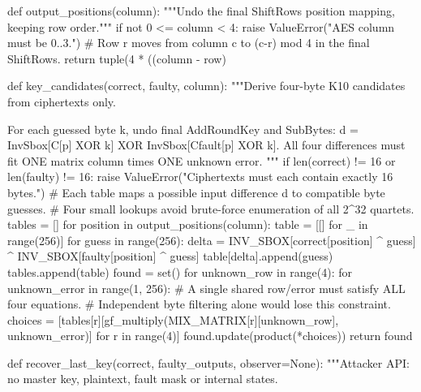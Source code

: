 \begin{lightcode}[numbers=left,firstnumber=1]
def output_positions(column):
    """Undo the final ShiftRows position mapping, keeping row order."""
    if not 0 <= column < 4:
        raise ValueError("AES column must be 0..3.")
    # Row r moves from column c to (c-r) mod 4 in the final ShiftRows.
    return tuple(4 * ((column - row) %


def key_candidates(correct, faulty, column):
    """Derive four-byte K10 candidates from ciphertexts only.

    For each guessed byte k, undo final AddRoundKey and SubBytes:
      d = InvSbox[C[p] XOR k] XOR InvSbox[Cfault[p] XOR k].
    All four differences must fit ONE matrix column times ONE unknown error.
    """
    if len(correct) != 16 or len(faulty) != 16:
        raise ValueError("Ciphertexts must each contain exactly 16 bytes.")
    # Each table maps a possible input difference d to compatible byte guesses.
    # Four small lookups avoid brute-force enumeration of all 2^32 quartets.
    tables = []
    for position in output_positions(column):
        table = [[] for _ in range(256)]
        for guess in range(256):
            delta = INV_SBOX[correct[position] ^ guess] ^ INV_SBOX[faulty[position] ^ guess]
            table[delta].append(guess)
        tables.append(table)
    found = set()
    for unknown_row in range(4):
        for unknown_error in range(1, 256):
            # A single shared row/error must satisfy ALL four equations.
            # Independent byte filtering alone would lose this constraint.
            choices = [tables[r][gf_multiply(MIX_MATRIX[r][unknown_row], unknown_error)] for r in range(4)]
            found.update(product(*choices))
    return found


def recover_last_key(correct, faulty_outputs, observer=None):
    """Attacker API: no master key, plaintext, fault mask or internal states.


\end{lightcode}
